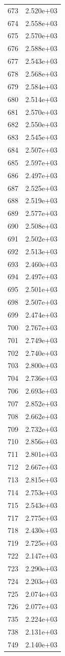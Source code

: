 \documentclass[12pt]{article}
\begin{document}
\begin{longtable}{@{}cc@{}}
673 & 2.520e+03 \\
674 & 2.558e+03 \\
675 & 2.570e+03 \\
676 & 2.588e+03 \\
677 & 2.543e+03 \\
678 & 2.568e+03 \\
679 & 2.584e+03 \\
680 & 2.514e+03 \\
681 & 2.570e+03 \\
682 & 2.550e+03 \\
683 & 2.545e+03 \\
684 & 2.507e+03 \\
685 & 2.597e+03 \\
686 & 2.497e+03 \\
687 & 2.525e+03 \\
688 & 2.519e+03 \\
689 & 2.577e+03 \\
690 & 2.508e+03 \\
691 & 2.502e+03 \\
692 & 2.513e+03 \\
693 & 2.460e+03 \\
694 & 2.497e+03 \\
695 & 2.501e+03 \\
698 & 2.507e+03 \\
699 & 2.474e+03 \\
700 & 2.767e+03 \\
701 & 2.749e+03 \\
702 & 2.740e+03 \\
703 & 2.800e+03 \\
704 & 2.736e+03 \\
706 & 2.693e+03 \\
707 & 2.852e+03 \\
708 & 2.662e+03 \\
709 & 2.732e+03 \\
710 & 2.856e+03 \\
711 & 2.801e+03 \\
712 & 2.667e+03 \\
713 & 2.815e+03 \\
714 & 2.753e+03 \\
715 & 2.543e+03 \\
717 & 2.775e+03 \\
718 & 2.430e+03 \\
719 & 2.725e+03 \\
722 & 2.147e+03 \\
723 & 2.290e+03 \\
724 & 2.203e+03 \\
725 & 2.074e+03 \\
726 & 2.077e+03 \\
735 & 2.224e+03 \\
738 & 2.131e+03 \\
749 & 2.140e+03 \\

\bottomrule
\end{longtable}
\end{document}

